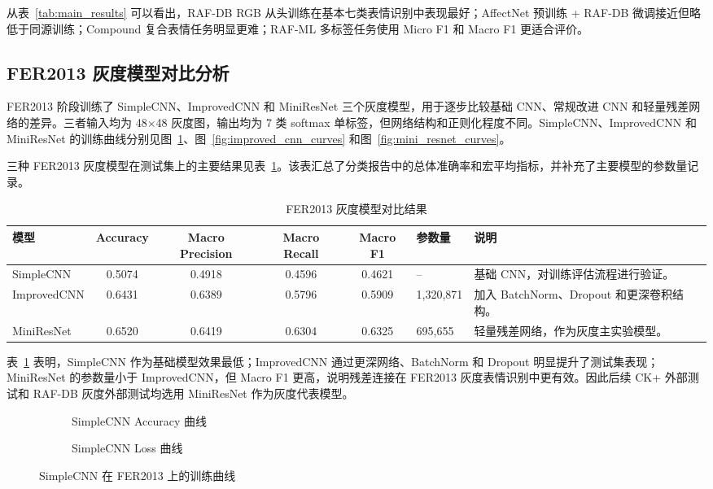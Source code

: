 \documentclass[UTF8,a4paper,12pt]{ctexart}
\newcommand{\figplaceholder}[1]{%
  \begin{center}
    \fbox{\parbox{0.78\textwidth}{\centering #1}}
  \end{center}
}
\begin{document}
从表~\ref{tab:main_results} 可以看出，RAF-DB RGB 从头训练在基本七类表情识别中表现最好；AffectNet 预训练 + RAF-DB 微调接近但略低于同源训练；Compound 复合表情任务明显更难；RAF-ML 多标签任务使用 Micro F1 和 Macro F1 更适合评价。

\subsection{FER2013 灰度模型对比分析}

FER2013 阶段训练了 SimpleCNN、ImprovedCNN 和 MiniResNet 三个灰度模型，用于逐步比较基础 CNN、常规改进 CNN 和轻量残差网络的差异。三者输入均为 48$\times$48 灰度图，输出均为 7 类 softmax 单标签，但网络结构和正则化程度不同。SimpleCNN、ImprovedCNN 和 MiniResNet 的训练曲线分别见图~\ref{fig:simple_cnn_curves}、图~\ref{fig:improved_cnn_curves} 和图~\ref{fig:mini_resnet_curves}。

三种 FER2013 灰度模型在测试集上的主要结果见表~\ref{tab:fer2013_gray_compare}。该表汇总了分类报告中的总体准确率和宏平均指标，并补充了主要模型的参数量记录。

\begin{table}[H]
  \centering
  \caption{FER2013 灰度模型对比结果}
  \label{tab:fer2013_gray_compare}
  \small
  \setlength{\tabcolsep}{4pt}
  \renewcommand{\arraystretch}{1.15}
  \begin{tabularx}{\textwidth}{lccccp{}X}
    \toprule
    模型 & Accuracy & Macro Precision & Macro Recall & Macro F1 & 参数量 & 说明 \\
    \midrule
    SimpleCNN & 0.5074 & 0.4918 & 0.4596 & 0.4621 & -- & 基础 CNN，对训练评估流程进行验证。\\
    ImprovedCNN & 0.6431 & 0.6389 & 0.5796 & 0.5909 & 1,320,871 & 加入 BatchNorm、Dropout 和更深卷积结构。\\
    MiniResNet & 0.6520 & 0.6419 & 0.6304 & 0.6325 & 695,655 & 轻量残差网络，作为灰度主实验模型。\\
    \bottomrule
  \end{tabularx}
\end{table}

表~\ref{tab:fer2013_gray_compare} 表明，SimpleCNN 作为基础模型效果最低；ImprovedCNN 通过更深网络、BatchNorm 和 Dropout 明显提升了测试集表现；MiniResNet 的参数量小于 ImprovedCNN，但 Macro F1 更高，说明残差连接在 FER2013 灰度表情识别中更有效。因此后续 CK+ 外部测试和 RAF-DB 灰度外部测试均选用 MiniResNet 作为灰度代表模型。

\begin{figure}[H]
  \centering
  \begin{subfigure}{0.48\textwidth}
    \centering
    \figplaceholder{\rule{0pt}{1.2em}}
    \caption{SimpleCNN Accuracy 曲线}
  \end{subfigure}
  \hfill
  \begin{subfigure}{0.48\textwidth}
    \centering
    \figplaceholder{\rule{0pt}{1.2em}}
    \caption{SimpleCNN Loss 曲线}
  \end{subfigure}
  \caption{SimpleCNN 在 FER2013 上的训练曲线}
  \label{fig:simple_cnn_curves}
\end{figure}
\end{document}
